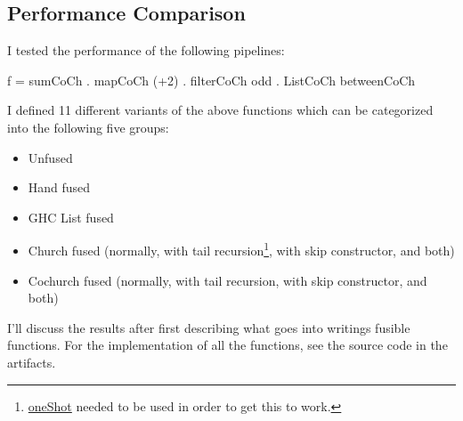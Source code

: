 \subsection{Performance Comparison}
I tested the performance of the following pipelines:
\begin{spec}
f = sumCoCh . mapCoCh (+2) . filterCoCh odd . ListCoCh betweenCoCh
\end{spec}
I defined 11 different variants of the above functions which can be categorized into the following five groups:
\begin{itemize}[noitemsep]
\item Unfused
\item Hand fused
\item GHC List fused
\item Church fused (normally, with tail recursion\footnote{\href{https://gitlab.haskell.org/ghc/ghc/-/wikis/one-shot}{oneShot} needed to be used in order to get this to work.}, with skip constructor, and both)
\item Cochurch fused (normally, with tail recursion, with skip constructor, and both)
\end{itemize}

I'll discuss the results after first describing what goes into writings fusible functions.
For the implementation of all the functions, see the source code in the artifacts.

